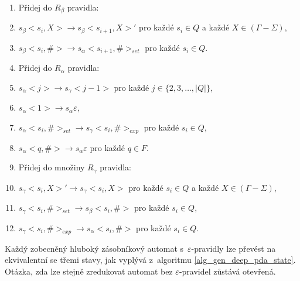 \begin{Alg}
\begin{list}{}{\setlength\parsep{0cm} \setlength\itemsep{0cm} \setlength\leftmargin{1em}}
\begin{enumerate}

   \item Přidej do $R_\beta$ pravidla:

\renewcommand{\labelenumi}{(\roman{enumi})}

   \item $s_\beta <s_i, X> \rightarrow s_\beta <s_{i+1}, X>'$ pro každé $s_i \in Q$ a každé $X \in (\Gamma - \Sigma)$,
   \item $s_\beta <s_i, \#> \rightarrow s_\alpha <s_{i+1}, \#>_{set}$ pro každé $s_i \in Q$.


   \item Přidej do $R_\alpha$ pravidla:

\renewcommand{\labelenumi}{(\roman{enumi})}

   \item $s_\alpha <j> \rightarrow s_\gamma <j - 1 > $ pro každé $j \in \{2,3,\dots,|Q|\}$,
   \item $s_\alpha <1> \rightarrow s_\alpha \varepsilon $,
   \item $s_\alpha <s_i, \#>_{set} \rightarrow s_\gamma <s_{i}, \#>_{exp}$ pro každé $s_i \in Q$,
   \item $s_\alpha <q, \#> \rightarrow s_\alpha \varepsilon $ pro každé $q \in F$.


   \item Přidej do množiny $R_\gamma$ pravidla:

\renewcommand{\labelenumi}{(\roman{enumi})}

   \item $s_\gamma <s_i, X>' \rightarrow s_\gamma <s_i, X> $ pro každé $s_i \in Q$ a každé $X \in (\Gamma - \Sigma)$,
   \item $s_\gamma <s_i, \#>_{set} \rightarrow s_\beta <s_i, \#>$ pro každé $s_i \in Q$,
   \item $s_\gamma <s_i, \#>_{exp} \rightarrow s_\alpha <s_{i}, \#>$ pro každé $s_i \in Q$.

\end{enumerate}

\end{list}
\end{Alg}

Každý zobecněný hluboký zásobníkový automat s~$\varepsilon$-pravidly lze převést na ekvivalentní se třemi stavy, jak vyplývá z~algoritmu \ref{alg_gen_deep_pda_state}. Otázka, zda lze stejně zredukovat automat bez $\varepsilon$-pravidel zůstává otevřená.

